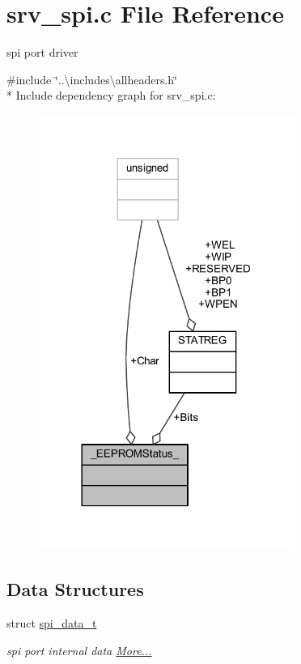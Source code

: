 \hypertarget{a00032}{\section{srv\+\_\+spi.\+c File Reference}
\label{a00032}
}


spi port driver  


{\ttfamily \#include \char`\"{}..\textbackslash{}includes\textbackslash{}allheaders.\+h\char`\"{}}\\*
Include dependency graph for srv\+\_\+spi.\+c\+:\nopagebreak
\begin{figure}[H]
\begin{center}
\leavevmode
\includegraphics[width=237pt]{d4/d8e/a01694}
\end{center}
\end{figure}
\subsection*{Data Structures}
\begin{DoxyCompactItemize}
\item 
struct \hyperlink{a00032_d6/d17/a00778}{spi\+\_\+data\+\_\+t}
\begin{DoxyCompactList}\small\item\em spi port internal data  \hyperlink{a00032_d6/d17/a00778}{More...}\end{DoxyCompactList}\end{DoxyCompactItemize}
